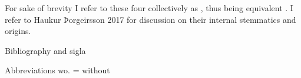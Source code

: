   For sake of brevity I refer to these four collectively as \GylfMS, thus being equivalent \RegiusProse\Trajectinus\Wormianus\Upsaliensis. I refer to Haukur Þorgeirsson 2017 for discussion on their internal stemmatics and origins.
  
Bibliography and sigla
  
Abbreviations
  wo. = without
